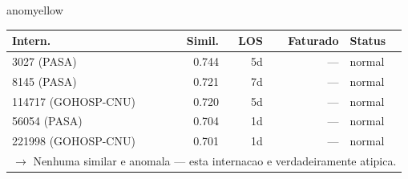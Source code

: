 \documentclass[a4paper,10pt]{article}
\begin{document}
\begin{anomalycard}[Internacao 4774 | GHO-PETROBRAS | MODERADO (z=2.25)]{anomyellow}
\begin{tabular}{l r r r l}\toprule\textbf{Intern.} & \textbf{Simil.} & \textbf{LOS} & \textbf{Faturado} & \textbf{Status} \\\midrule
3027 (PASA) & 0.744 & 5d & --- & \textcolor{jcubeblue}{normal} \\
8145 (PASA) & 0.721 & 7d & --- & \textcolor{jcubeblue}{normal} \\
114717 (GOHOSP-CNU) & 0.720 & 5d & --- & \textcolor{jcubeblue}{normal} \\
56054 (PASA) & 0.704 & 1d & --- & \textcolor{jcubeblue}{normal} \\
221998 (GOHOSP-CNU) & 0.701 & 1d & --- & \textcolor{jcubeblue}{normal} \\
\multicolumn{5}{l}{\textcolor{jcubeblue}{\small $\rightarrow$ Nenhuma similar e anomala --- esta internacao e verdadeiramente atipica.}} \\
\bottomrule\end{tabular}


\end{anomalycard}

\newpage
\end{document}
